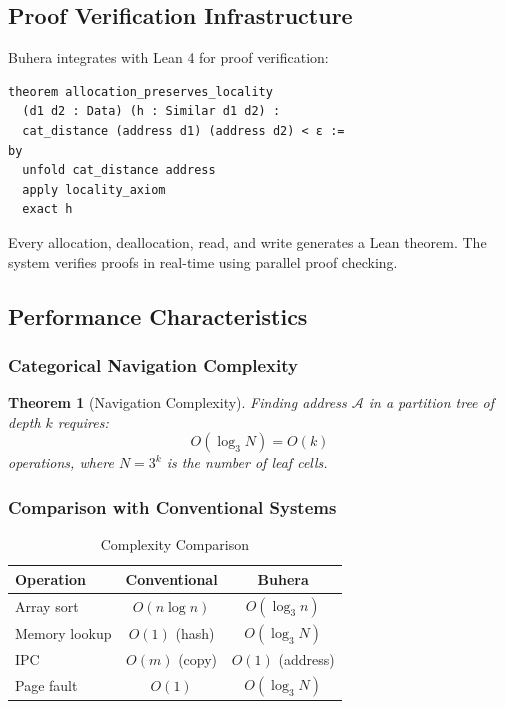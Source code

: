 \documentclass[twocolumn,10pt]{article}
\newtheorem{theorem}{Theorem}[section]
\theoremstyle{definition}
\theoremstyle{remark}
\newcommand{\cataddr}{\mathcal{A}}
\begin{document}
\subsection{Proof Verification Infrastructure}

Buhera integrates with Lean 4 for proof verification:

\begin{verbatim}
theorem allocation_preserves_locality
  (d1 d2 : Data) (h : Similar d1 d2) :
  cat_distance (address d1) (address d2) < ε :=
by
  unfold cat_distance address
  apply locality_axiom
  exact h
\end{verbatim}

Every allocation, deallocation, read, and write generates a Lean theorem. The system verifies proofs in real-time using parallel proof checking.

\subsection{Performance Characteristics}

\subsubsection{Categorical Navigation Complexity}

\begin{theorem}[Navigation Complexity]
Finding address $\cataddr$ in a partition tree of depth $k$ requires:
\begin{equation}
    O(\log_3 N) = O(k)
\end{equation}
operations, where $N = 3^k$ is the number of leaf cells.
\end{theorem}

\subsubsection{Comparison with Conventional Systems}

\begin{table}[h]
\centering
\caption{Complexity Comparison}
\begin{tabular}{lcc}
\toprule
Operation & Conventional & Buhera \\
\midrule
Array sort & $O(n \log n)$ & $O(\log_3 n)$ \\
Memory lookup & $O(1)$ (hash) & $O(\log_3 N)$ \\
IPC & $O(m)$ (copy) & $O(1)$ (address) \\
Page fault & $O(1)$ & $O(\log_3 N)$ \\
\bottomrule
\end{tabular}
\end{table}
\end{document}
